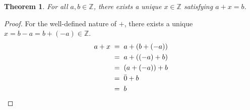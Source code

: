 \documentclass[10pt]{article}
\newtheorem{theorem}{Theorem}[section]
\theoremstyle{definition}
\theoremstyle{remark}
\begin{document}
        \begin{theorem}
                        For all $a, b \in \mathbb{Z}$, there exists a unique $x \in \mathbb{Z}$ satisfying $a + x = b$.
        \end{theorem}
        \begin{proof}
                For the well-defined nature of $+$, there exists a unique $x = b - a = b + (-a) \in \mathbb{Z}$.
                \begin{align*}
                        a + x \;&=\; a + (b + (-a)) \\
                                \;&=\; a + ((-a) + b) \\
                                \;&=\; (a + (-a)) + b \\
                                \;&=\; \bar{0} + b \\
                                \;&=\; b \qedhere
                \end{align*}
        \end{proof}
\end{document}
